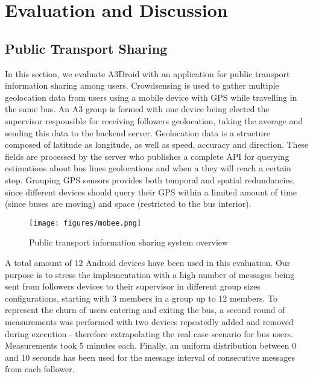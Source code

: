\section{Evaluation and Discussion}
\label{sec:evaluation}



\subsection{Public Transport Sharing}\label{sec:mobee}

In this section, we evaluate A3Droid with an application for public transport information sharing among users. Crowdsensing is used to gather multiple geolocation data from users using a mobile device with GPS while travelling in the same bus. An A3 group is formed with one device being elected the supervisor responsible for receiving followers geolocation, taking the average and sending this data to the backend server. Geolocation data is a structure composed of latitude as longitude, as well as speed, accuracy and direction. These fields are processed by the server who publishes a complete API for querying estimations about bus lines geolocations and when a they will reach a certain stop. Grouping GPS sensors provides both temporal and spatial redundancies, since different devices should query their GPS within a limited amount of time (since buses are moving) and space (restricted to the bus interior). 

\begin{figure}[!ht]
\centering
\texttt{[image: figures/mobee.png]}
\caption{Public transport information sharing system overview}
\label{fig:MOBEE_OVERVIEW}
\end{figure}

A total amount of 12 Android devices have been used in this evaluation. Our purpose is to stress the implementation with a high number of messages being sent from followers devices to their supervisor in different group sizes configurations, starting with 3 members in a group up to 12 members. To represent the churn of users entering and exiting the bus, a second round of measurements was performed with two devices repeatedly added and removed during execution - therefore extrapolating the real case scenario for bus users. Measurements took 5 minutes each. Finally, an uniform distribution between 0 and 10 seconds has been used for the message interval of consecutive messages from each follower.

